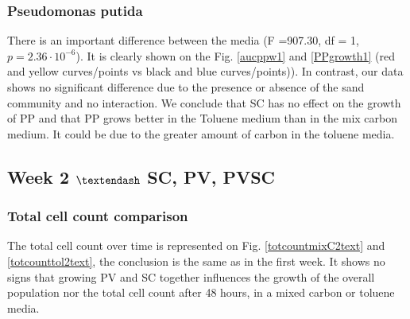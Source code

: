 \documentclass[a4paper, 10pt, conference]{ieeeconf}   %
\begin{document}
\subsubsection{Pseudomonas putida}
There is an important difference between the media (F =907.30, df = 1, $p = 2.36 \cdot 10^{-6}$). It is clearly shown on the Fig. \ref{aucppw1} and \ref{PPgrowth1} (red and yellow curves/points vs black and blue curves/points)).
In contrast, our data shows no significant difference due to the presence or absence of the sand community and no interaction.
We conclude that SC has no effect on the growth of PP and that PP grows better in the Toluene medium than in the mix carbon medium. It could be due to the greater amount of carbon in the toluene media.



%	
%	


\subsection{Week 2 $\textendash$ SC, PV, PVSC}

\subsubsection{Total cell count comparison}
The total cell count over time is represented on Fig. \ref{totcountmixC2text} and \ref{totcounttol2text}, the conclusion is the same as in the first week. It shows no signs that growing PV and SC together influences the growth of the overall population nor the total cell count after 48 hours, in a mixed carbon or toluene media.\newline
\end{document}
